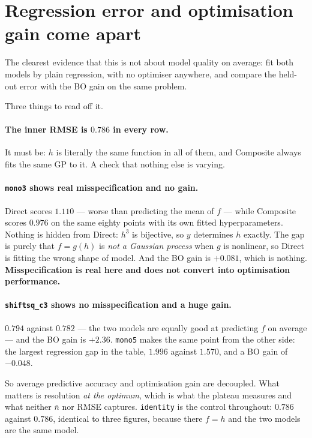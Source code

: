 \documentclass[11pt]{article}
\begin{document}
\section{Regression error and optimisation gain come apart}

The clearest evidence that this is not about model quality on average: fit
both models by plain regression, with no optimiser anywhere, and compare the
held-out error with the BO gain on the same problem.



Three things to read off it.

\paragraph{The inner RMSE is $0.786$ in every row.} It must be: $h$ is
literally the same function in all of them, and Composite always fits the same
GP to it. A check that nothing else is varying.

\paragraph{\texttt{mono3} shows real misspecification and no gain.} Direct
scores $1.110$ --- worse than predicting the mean of $f$ --- while Composite
scores $0.976$ on the same eighty points with its own fitted hyperparameters.
Nothing is hidden from Direct: $h^3$ is bijective, so $y$ determines $h$
exactly. The gap is purely that $f=g(h)$ is \emph{not a Gaussian process} when
$g$ is nonlinear, so Direct is fitting the wrong shape of model. And the BO
gain is $+0.081$, which is nothing. \textbf{Misspecification is real here and
does not convert into optimisation performance.}

\paragraph{\texttt{shiftsq\_c3} shows no misspecification and a huge gain.}
$0.794$ against $0.782$ --- the two models are equally good at predicting $f$
on average --- and the BO gain is $+2.36$. \texttt{mono5} makes the same point
from the other side: the largest regression gap in the table, $1.996$ against
$1.570$, and a BO gain of $-0.048$.

\medskip
\noindent So average predictive accuracy and optimisation gain are decoupled.
What matters is resolution \emph{at the optimum}, which is what the plateau
measures and what neither $\bar n$ nor RMSE captures.
\texttt{identity} is the control throughout: $0.786$ against $0.786$,
identical to three figures, because there $f=h$ and the two models are the
same model.
\end{document}

